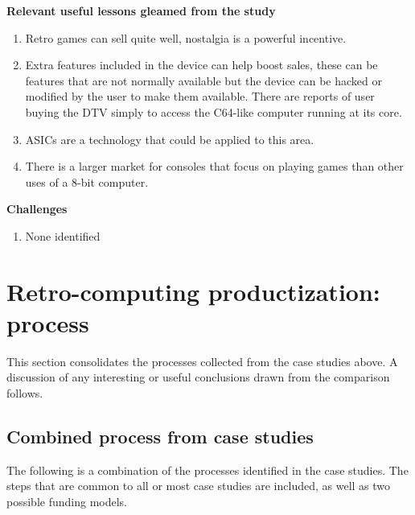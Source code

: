\textbf{Relevant useful lessons gleamed from the study}\\
\begin{enumerate}
\item Retro games can sell quite well, nostalgia is a powerful incentive.
\item Extra features included in the device can help boost sales, these can be features that are not normally available but the device can be hacked or modified by the user to make them available. There are reports of user buying the DTV simply to access the C64-like computer running at its core.
\item ASICs are a technology that could be applied to this area.
\item There is a larger market for consoles that focus on playing games than other uses of a 8-bit computer.
\end{enumerate}

\textbf{Challenges}
\begin{enumerate}
\item None identified
\end{enumerate}

\section{Retro-computing productization: process}
This section consolidates the processes collected from the case studies above. A discussion of any interesting or useful conclusions drawn from the comparison follows.\\

\subsection{Combined process from case studies}
The following is a combination of the processes identified in the case studies. The steps that are common to all or most case studies are included, as well as two possible funding models.\\

